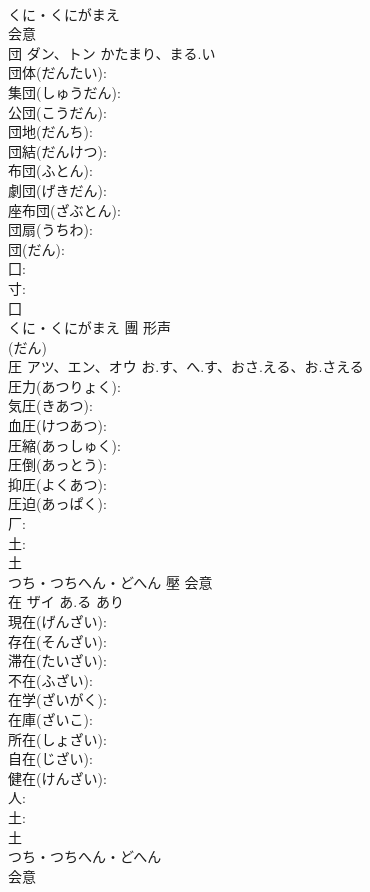\documentclass[8pt]{extreport}
\begin{document}
\begin{CJK}{UTF8}{min}
\\	くに・くにがまえ	
\\	会意 
\\	団	ダン、トン	かたまり、まる.い		
\\	団体(だんたい): 
\\	集団(しゅうだん): 
\\	公団(こうだん): 
\\	団地(だんち): 
\\	団結(だんけつ): 
\\	布団(ふとん): 
\\	劇団(げきだん): 
\\	座布団(ざぶとん): 
\\	団扇(うちわ): 
\\	団(だん): 
\\	囗: 
\\	寸: 
\\	囗	
\\	くに・くにがまえ	團	形声 
\\	(だん) 
\\	圧	アツ、エン、オウ	お.す、へ.す、おさ.える、お.さえる		
\\	圧力(あつりょく): 
\\	気圧(きあつ): 
\\	血圧(けつあつ): 
\\	圧縮(あっしゅく): 
\\	圧倒(あっとう): 
\\	抑圧(よくあつ): 
\\	圧迫(あっぱく): 
\\	厂: 
\\	土: 
\\	土	
\\	つち・つちへん・どへん	壓	会意 
\\	在	ザイ	あ.る	あり	
\\	現在(げんざい): 
\\	存在(そんざい): 
\\	滞在(たいざい): 
\\	不在(ふざい): 
\\	在学(ざいがく): 
\\	在庫(ざいこ): 
\\	所在(しょざい): 
\\	自在(じざい): 
\\	健在(けんざい): 
\\	人: 
\\	土: 
\\	土	
\\	つち・つちへん・どへん	
\\	会意 

\end{CJK}
\end{document}
